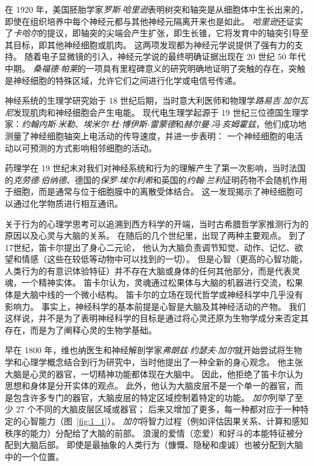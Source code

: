 在 1920 年，美国胚胎学家\textit{罗斯$\cdot$哈里逊}表明树突和轴突是从细胞体中生长出来的，即使在组织培养中每个神经元都与其他神经元隔离开来也是如此。
\textit{哈里逊}还证实了\textit{卡哈尔}的提议，即轴突的尖端会产生扩张，即生长锥，它将发育中的轴突引导至其目标，即其他神经细胞或肌肉。
这两项发现都为神经元学说提供了强有力的支持。
随着电子显微镜的引入，神经元学说的最终明确证据出现在 20 世纪 50 年代中期。
\textit{桑福德$\cdot$帕莱}的一项具有里程碑意义的研究明确地证明了突触的存在，突触是神经细胞的特殊区域，允许它们之间进行化学或电信号传递。


神经系统的生理学研究始于 18 世纪后期，当时意大利医师和物理学\textit{路易吉$\cdot$加尔瓦尼}发现肌肉和神经细胞会产生电能。
现代电生理学起源于 19 世纪三位德国生理学家：\textit{约翰内斯$\cdot$米勒}、\textit{埃米尔$\cdot$杜$\cdot$博伊斯-雷蒙德}和\textit{赫尔曼$\cdot$冯$\cdot$亥姆霍兹}，他们成功地测量了神经细胞轴突上电活动的传导速度，并进一步表明：
一个神经细胞的电活动以可预测的方式影响相邻细胞的活动。


药理学在 19 世纪末对我们对神经系统和行为的理解产生了第一次影响，当时法国的\textit{克劳德$\cdot$伯纳德}、德国的\textit{保罗$\cdot$埃尔利希}和英国的\textit{约翰$\cdot$兰利}证明药物不会随机作用于细胞，而是通常与位于细胞膜中的离散受体结合。 
这一发现揭示了神经细胞可以通过化学物质进行相互通讯。


关于行为的心理学思考可以追溯到西方科学的开端，当时古希腊哲学家推测行为的原因以及心灵与大脑的关系。
在随后的几个世纪里，出现了两种主要观点。
到了17世纪，笛卡尔提出了身心二元论，
他认为大脑负责调节知觉、动作、记忆、欲望和情感（这些在较低等动物中可以找到的一切）。
但是心智（更高的心智功能，人类行为的有意识体验特征）并不存在大脑或身体的任何其他部分，而是代表灵魂，一个精神实体。
笛卡尔认为，灵魂通过松果体与大脑的机器进行交流，松果体是大脑中线的一个微小结构。
笛卡尔的立场在现代哲学或神经科学中几乎没有影响力。
事实上，神经科学的基本前提是心智是大脑及其神经活动的产物。
我们这样说，并不是为了表明神经科学的目标是通过将心灵还原为生物学成分来否定其存在，而是为了阐释心灵的生物学基础。


早在 1800 年，维也纳医生和神经解剖学家\textit{弗朗兹$\cdot$约瑟夫$\cdot$加尔}就开始尝试将生物学和心理学概念结合到行为研究中，当时他提出了一种全新的身心观念。
他主张大脑是心灵的器官，一切精神功能都体现在大脑中。
因此，他拒绝了笛卡尔认为思想和身体是分开实体的观点。
此外，他认为大脑皮层不是一个单一的器官，而是包含许多专门的器官，大脑皮层的特定区域控制着特定的功能。 
\textit{加尔}列举了至少 27 个不同的大脑皮层区域或器官； 后来又增加了更多，每一种都对应于一种特定的心智能力（图~\ref{fig:1_1}）。
\textit{加尔}将智力过程（例如评估因果关系、计算和感知秩序的能力）分配给了大脑的前部。
浪漫的爱情（恋爱）和好斗的本能特征被分配到大脑后部。
即使是最抽象的人类行为（慷慨、隐秘和虔诚）也被分配到大脑中的一个位置。


